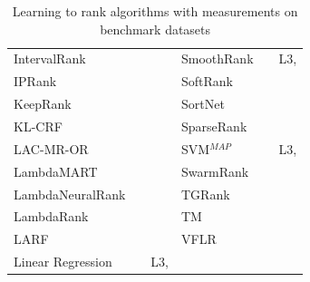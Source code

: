 \documentclass{sig-alternate}
\begin{document}
\begin{table}[!hpt]
{\begin{tabular}{lll|lll}
IntervalRank & \cite{Moon2010} & \cite{Moon2010, Freno2011} & SmoothRank & \cite{Chapelle2010} & L3, \cite{Chapelle2010} \\
IPRank & \cite{Wang2009b} & \cite{Wang2009b, Torkestani2012} & SoftRank & \cite{Taylor2008, Guiver2008} & \cite{Qin2010b} \\ 
KeepRank & \cite{Chen2009} & \cite{Chen2009} & SortNet & \cite{Rigutini2008} & \cite{Rigutini2008,Freno2011} \\
KL-CRF & \cite{Volkovs2011} & \cite{Volkovs2011} & SparseRank & \cite{Lai2013b} & \cite{Lai2013b} \\ 
LAC-MR-OR & \cite{Veloso2008} & \cite{Veloso2008} & SVM$^{MAP}$ & \cite{Yue2007} & L3, \cite{Wang2012, Xu2008, Niu2012} \\ 
LambdaMART & \cite{Burges2010} & \cite{Asadi2013a, Ganjisaffar2011c} &SwarmRank & \cite{Diaz-Aviles2009} & \cite{Sato2013} \\ 
LambdaNeuralRank & \cite{Papini2012} & \cite{Papini2012} & TGRank & \cite{Lai2013} & \cite{Lai2013} \\ 
LambdaRank & \cite{Burges2006} &  & TM & \cite{Zhou2008} & \cite{Zhou2008, Papini2012, Tan2013} \\ 
LARF & \cite{Torkestani2012} & \cite{Torkestani2012} &  VFLR & \cite{Cai2012} & \cite{Cai2012} \\
Linear Regression & \cite{Cossock2006} & L3, \cite{Wang2012, Volkovs2011} & & & \\
\bottomrule
\end{tabular}
\caption{Learning to rank algorithms with measurements on benchmark datasets}}
\label{tab:ltr_methods_used}
\end{table}
\end{document}

